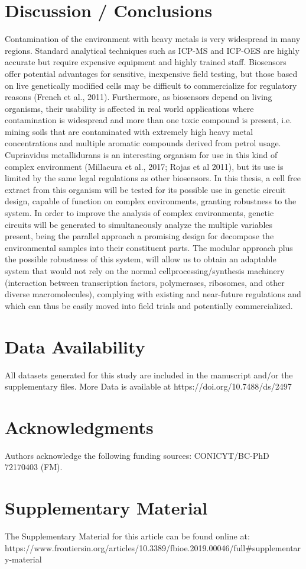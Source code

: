 \section{\textbf{Discussion / Conclusions}}
Contamination of the environment with heavy metals is very widespread in many regions. Standard
analytical techniques such as ICP-MS and ICP-OES are highly accurate but require expensive equipment
and highly trained staff. Biosensors offer potential advantages for sensitive, inexpensive field testing, but
those based on live genetically modified cells may be difficult to commercialize for regulatory reasons
(French et al., 2011). Furthermore, as biosensors depend on living organisms, their usability is affected in
real world applications where contamination is widespread and more than one toxic compound is present,
i.e. mining soils that are contaminated with extremely high heavy metal concentrations and multiple aromatic
compounds derived from petrol usage. Cupriavidus metallidurans is an interesting organism for use in this
kind of complex environment (Millacura et al., 2017; Rojas et al 2011), but its use is limited by the same legal
regulations as other biosensors. In this thesis, a cell free extract from this organism will be tested for its
possible use in genetic circuit design, capable of function on complex environments, granting robustness to
the system.
In order to improve the analysis of complex environments, genetic circuits will be generated to
simultaneously analyze the multiple variables present, being the parallel approach a promising design for
decompose the environmental samples into their constituent parts. The modular approach plus the possible
robustness of this system, will allow us to obtain an adaptable system that would not rely on the normal cellprocessing/synthesis machinery (interaction between transcription factors, polymerases, ribosomes, and
other diverse macromolecules), complying with existing and near-future regulations and which can thus be
easily moved into field trials and potentially commercialized.
\section{\textbf{Data Availability}}
All datasets generated for this study are included in the manuscript and/or the supplementary files. More Data is available at https://doi.org/10.7488/ds/2497

\section{\textbf{Acknowledgments}}

Authors acknowledge the following funding sources: CONICYT/BC-PhD 72170403 (FM). 

\section{\textbf{Supplementary Material}}

The Supplementary Material for this article can be found online at: https://www.frontiersin.org/articles/10.3389/fbioe.2019.00046/full\#supplementary-material
